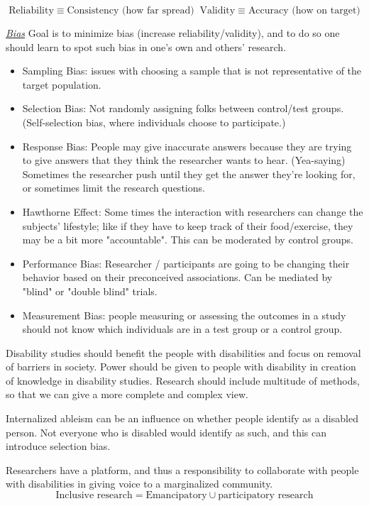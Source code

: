 \documentclass{TC}
\begin{document}
\vspace{-2em}
$$\text{Reliability}\equiv \text{Consistency (how far spread)} \;\; \text{Validity} \equiv  \text{Accuracy (how on target)} $$

\underline{\textit{Bias}}
Goal is to minimize bias (increase reliability/validity), and to do so one should learn to spot such bias in one's own and others' research.

\begin{itemize}
\item Sampling Bias: issues with choosing a sample that is not representative of the target population.

\item Selection Bias: Not randomly assigning folks between control/test groups. (Self-selection bias, where individuals choose to participate.)
\item Response Bias: People may give inaccurate answers because they are trying to give answers that they think the researcher wants to hear. (Yea-saying) Sometimes the researcher push until they get the answer they're looking for, or sometimes limit the research questions.
\item Hawthorne Effect: Some times the interaction with researchers can change the subjects' lifestyle; like if they have to keep track of their food/exercise, they may be a bit more "accountable". This can be moderated by control groups.  
\item Performance Bias: Researcher / participants are going to be changing their behavior based on their preconceived associations. Can be mediated by "blind" or "double blind" trials.	
\item Measurement Bias: people measuring or assessing the outcomes in a study should not know which individuals are in a test group or a control group.
\end{itemize}

Disability studies should benefit the people with disabilities and focus on removal of barriers in society. Power should be given to people with disability in creation of knowledge in disability studies. Research should include multitude of methods, so that we can give a more complete and complex view. 

Internalized ableism can be an influence on whether people identify as a disabled person. Not everyone who is disabled would identify as such, and this can introduce selection bias. 

Researchers have a platform, and thus a responsibility to collaborate with people with disabilities in giving voice to a marginalized community.
$$ \text{Inclusive research} = \text{Emancipatory} \cup \text{participatory research}$$
\end{document}

